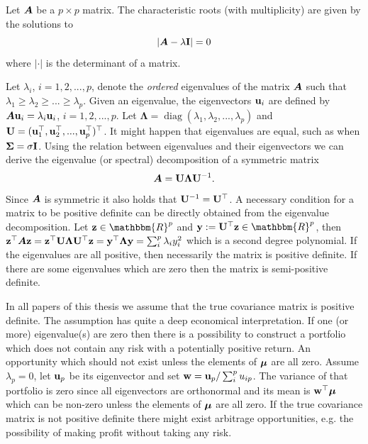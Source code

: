 \documentclass[oneside]{book}\usepackage{knitr}
\begin{document}
\begin{definition}\label{def:eigenvalue} 
	Let $\mbox{\boldmath$A$}$ be a $p\times p$ matrix. The characteristic roots (with multiplicity) are given by the solutions to
	\begin{equation*}
		\left|\mbox{\boldmath$A$} - \lambda \mathbf{I}\right| = 0
	\end{equation*}
	where $|\cdot|$ is the determinant of a matrix.
\end{definition} 
Let $\lambda_i$, $i=1,2,...,p$, denote the \textit{ordered} eigenvalues of the matrix $\mbox{\boldmath$A$}$ such that $\lambda_1\geq \lambda_2 \geq ... \geq \lambda_p$.
Given an eigenvalue, the eigenvectors $\mathbf{u}_i$ are defined by $\mbox{\boldmath$A$} \mathbf{u}_i = \lambda_i \mathbf{u}_i$, $i=1,2,...,p$. 
Let $\boldsymbol{\Lambda} = \operatorname{diag}(\lambda_1, \lambda_2,...,\lambda_p)$ and $\mathbf{U}= (\mathbf{u}_1^\top, \mathbf{u}_2^\top, ..., \mathbf{u}_p^\top)^\top$. 
It might happen that eigenvalues are equal, such as when $\mathbf{\Sigma} = \sigma \mathbf{I}$.
Using the relation between eigenvalues and their eigenvectors we can derive the eigenvalue (or spectral) decomposition of a symmetric matrix 
\begin{equation}\label{eqn:eigenvalue_decomp}
	\mbox{\boldmath$A$} = \mathbf{U} \boldsymbol{\Lambda} \mathbf{U}^{-1}.
\end{equation}
Since $\mbox{\boldmath$A$}$ is symmetric it also holds that $\mathbf{U}^{-1} = \mathbf{U}^\top$.
A necessary condition for a matrix to be positive definite can be directly obtained from the eigenvalue decomposition. 
Let $\bz\in \mathbbm{R}^p$ and $\by := \bU^{\top} \bz \in \mathbbm{R}^p$, then $\mathbf{z}^\top \mbox{\boldmath$A$} \mathbf{z} = \mathbf{z}^\top \mathbf{U} \boldsymbol{\Lambda} \mathbf{U} ^{\top} \mathbf{z} = \mathbf{y}^\top \boldsymbol{\Lambda} \mathbf{y} = \sum_i^p \lambda_i y_i^2$ which is a second degree polynomial. 
If the eigenvalues are all positive, then necessarily the matrix is positive definite. 
If there are some eigenvalues which are zero then the matrix is semi-positive definite. 

In all papers of this thesis we assume that the true covariance matrix is positive definite. 
The assumption has quite a deep economical interpretation.
If one (or more) eigenvalue(s) are zero then there is a possibility to construct a portfolio which does not contain any risk with a potentially positive return. 
An opportunity which should not exist unless the elements of $\mbox{\boldmath$\mu$}$ are all zero.
Assume $\lambda_p=0$, let $\mathbf{u}_p$ be its eigenvector and set $\mathbf{w} = \mathbf{u}_p / \sum_i^p u_{ip}$. 
The variance of that portfolio is zero since all eigenvectors are orthonormal and its mean is $\mathbf{w}^\top \mbox{\boldmath$\mu$}$ which can be non-zero unless the elements of $\mbox{\boldmath$\mu$}$ are all zero.
If the true covariance matrix is not positive definite there might exist arbitrage opportunities, e.g. the possibility of making profit without taking any risk.
\end{document}
